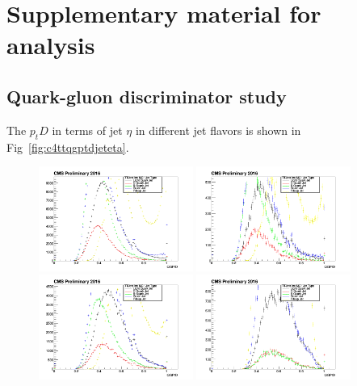 \chapter{Supplementary material for analysis}
\clearpage
\section{Quark-gluon discriminator study}

The $p_{t}D$ in terms of jet $\eta$ in different jet flavors is shown in Fig~\ref{fig:c4ttqgptdjeteta}.
\begin{figure}[htbp]
 \begin{center}
  \includegraphics[width=0.45\textwidth]{sections/mc4/TopTagger/figures/_b_qgptdjetetabin0_.png}
  \includegraphics[width=0.45\textwidth]{sections/mc4/TopTagger/figures/_b_qgptdjetetabin1_.png} \\
  \includegraphics[width=0.45\textwidth]{sections/mc4/TopTagger/figures/_b_qgptdjetetabin2_.png}
  \includegraphics[width=0.45\textwidth]{sections/mc4/TopTagger/figures/_b_qgptdjetetabin3_.png} \\

\end{center}
\end{figure}
